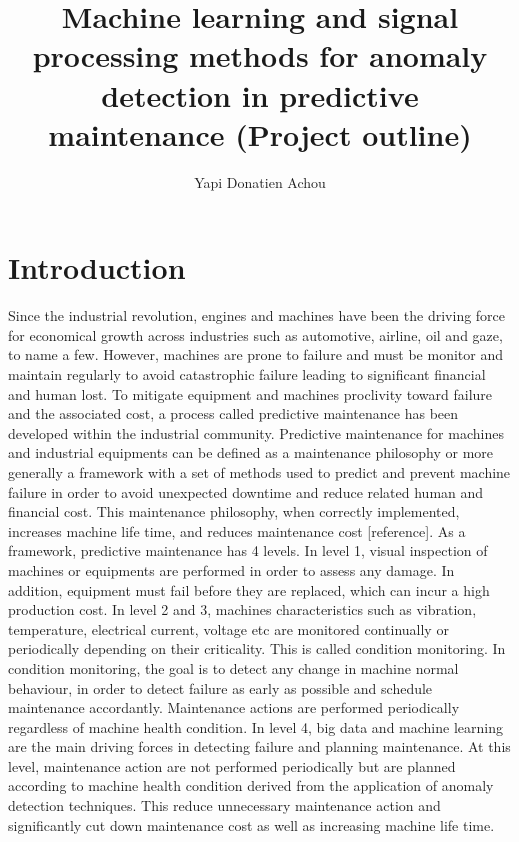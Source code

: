 \documentclass[11pt, oneside]{article}   	%
\title{Machine learning and signal processing methods for anomaly detection in predictive maintenance (Project outline)}
\author{Yapi Donatien Achou}
\begin{document}
\maketitle
\tableofcontents
\newpage
\section{Introduction}
Since the industrial revolution, engines and machines have been the driving force for economical growth across industries such as automotive, airline, oil and gaze, to name a few. However, machines are prone to failure and must be monitor and maintain regularly to avoid catastrophic failure leading to significant financial and human lost. To mitigate equipment and machines proclivity toward failure and the associated cost, a process called predictive maintenance has been developed within the industrial community. Predictive maintenance  for machines and industrial equipments can be defined as a maintenance philosophy or more generally a framework with a set of methods used to predict and prevent machine failure in order to avoid unexpected downtime and reduce related human and financial cost. This maintenance philosophy, when correctly implemented, increases machine life time, and reduces maintenance cost [reference].
\justify
As a framework, predictive maintenance has 4 levels. In level 1, visual inspection of machines or equipments are performed in order to assess any damage.
In addition, equipment must fail before they are replaced, which can incur a high production cost. In level 2 and 3, machines characteristics such as vibration, temperature, electrical current, voltage etc are monitored continually or periodically depending on their criticality. This is called condition monitoring. In condition monitoring, the goal is to detect any change in machine normal behaviour, in order to detect failure as early as possible and schedule maintenance accordantly. Maintenance actions are performed periodically regardless of machine health condition. In level 4, big data and machine learning are the main driving forces in detecting failure and planning maintenance. At this level, maintenance action are not performed periodically but are planned according to machine health condition derived from the application of anomaly detection techniques. This reduce unnecessary maintenance action and significantly cut down maintenance cost as well as increasing machine life time.
\end{document}
